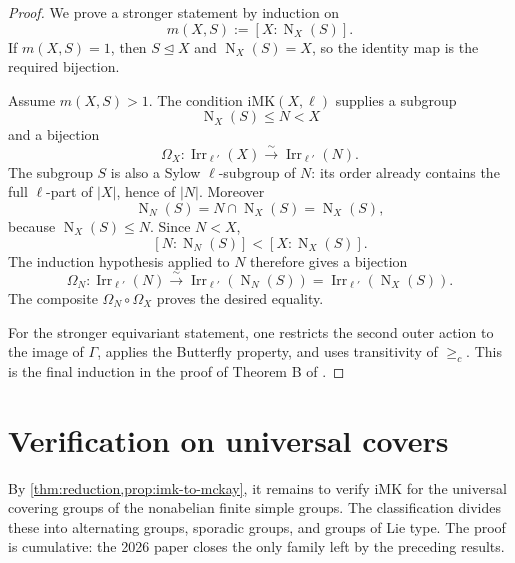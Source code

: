 \documentclass[11pt]{article}
\newcommand{\Irr}{\operatorname{Irr}}
\newcommand{\Norm}{\operatorname{N}}
\newcommand{\IMK}{\mathrm{iMK}}
\begin{document}
\begin{proof}
We prove a stronger statement by induction on
\[
  m(X,S):=[X:\Norm_X(S)].
\]
If \(m(X,S)=1\), then \(S\trianglelefteq X\) and
\(\Norm_X(S)=X\), so the identity map is the required bijection.

Assume \(m(X,S)>1\).  The condition \(\IMK(X,\ell)\) supplies a subgroup
\[
  \Norm_X(S)\leq N<X
\]
and a bijection
\[
  \Omega_X:\Irr_{\ell'}(X)\xrightarrow{\sim}\Irr_{\ell'}(N).
\]
The subgroup \(S\) is also a Sylow \(\ell\)-subgroup of \(N\): its order
already contains the full \(\ell\)-part of \(|X|\), hence of \(|N|\).
Moreover
\[
  \Norm_N(S)=N\cap\Norm_X(S)=\Norm_X(S),
\]
because \(\Norm_X(S)\leq N\).  Since \(N<X\),
\[
  [N:\Norm_N(S)]<[X:\Norm_X(S)].
\]
The induction hypothesis applied to \(N\) therefore gives a bijection
\[
  \Omega_N:\Irr_{\ell'}(N)
    \xrightarrow{\sim}
  \Irr_{\ell'}(\Norm_N(S))
  =
  \Irr_{\ell'}(\Norm_X(S)).
\]
The composite \(\Omega_N\circ\Omega_X\) proves the desired equality.

For the stronger equivariant statement, one restricts the second outer
action to the image of \(\Gamma\), applies the Butterfly property, and
uses transitivity of \(\geq_c\).  This is the final induction in the proof
of Theorem B of \cite{CabanesSpath2026}.
\end{proof}

\section{Verification on universal covers}

By \cref{thm:reduction,prop:imk-to-mckay}, it remains to verify
\(\IMK\) for the universal covering groups of the nonabelian finite
simple groups.  The classification divides these into alternating
groups, sporadic groups, and groups of Lie type.  The proof is cumulative:
the 2026 paper closes the only family left by the preceding results.
\end{document}
